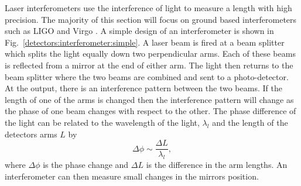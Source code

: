 Laser interferometers use the interference of light to measure a length with high precision.
The majority of this section will focus on ground based interferometers such as \gls{LIGO} and Virgo \citep{aasi2015AdvancedLIGO,acernese2015AdvancedVirgo}.
A simple design of an interferometer is shown in Fig.~\ref{detectors:interferometer:simple}. 
A laser beam is fired at a beam splitter which splits the light equally down two perpendicular arms. 
Each of these beams is reflected from a mirror at the end of either arm.
The light then returns to the beam splitter where the two beams are combined and sent to a photo-detector.
At the output, there is an interference pattern between the two beams.
If the length of one of the arms is changed then the interference pattern will change as the phase of one beam changes with respect to the other.
The phase difference of the light can be related to the wavelength of the light, $\lambda_l$ and the length of the detectors arms $L$ by
\begin{equation}
\label{intro:detectors:phasechange}
\Delta \phi \sim \frac{\Delta L}{\lambda_l},
\end{equation}
where $\Delta  \phi$ is the phase change and $\Delta L$ is the difference in the arm lengths.
An interferometer can then measure small changes in the mirrors position.
